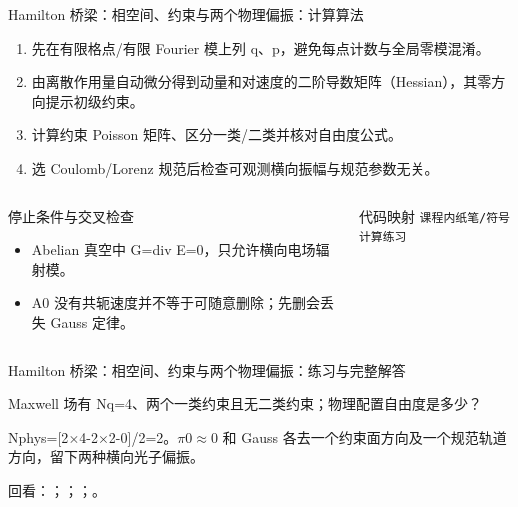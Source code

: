 \begin{frame}[t]{Hamilton 桥梁：相空间、约束与两个物理偏振：计算算法}
\footnotesize
{}\begin{enumerate}
\item 先在有限格点/\allowbreak{}有限 Fourier 模上列 q、p，避免每点计数与全局零模混淆。
\item 由离散作用量自动微分得到动量和对速度的二阶导数矩阵（Hessian），其零方向提示初级约束。
\item 计算约束 Poisson 矩阵、区分一类/\allowbreak{}二类并核对自由度公式。
\item 选 Coulomb/\allowbreak{}Lorenz 规范后检查可观测横向振幅与规范参数无关。
\end{enumerate}\begin{columns}[T,onlytextwidth]
\begin{block}{停止条件与交叉检查}\scriptsize\begin{itemize}
\item[\CheckMark] Abelian 真空中 G=div E=0，只允许横向电场辐射模。
\item[\CheckMark] A0 没有共轭速度并不等于可随意删除；先删会丢失 Gauss 定律。
\end{itemize}\end{block}
\begin{block}{代码映射}
\scriptsize \texttt{课程内纸笔/\allowbreak{}符号计算练习}
\end{block}\end{columns}\end{frame}

\begin{frame}[t]{Hamilton 桥梁：相空间、约束与两个物理偏振：练习与完整解答}
\footnotesize
\begin{block}{}Maxwell 场有 Nq=4、两个一类约束且无二类约束；物理配置自由度是多少？\end{block}
\begin{exampleblock}{}Nphys=[2\ensuremath{\times}4-2\ensuremath{\times}2-0]/\allowbreak{}2=2。\ensuremath{\pi}0\ensuremath{\approx}0 和 Gauss 各去一个约束面方向及一个规范轨道方向，留下两种横向光子偏振。\end{exampleblock}
\vfill
\scriptsize 回看：；；；。
\end{frame}

